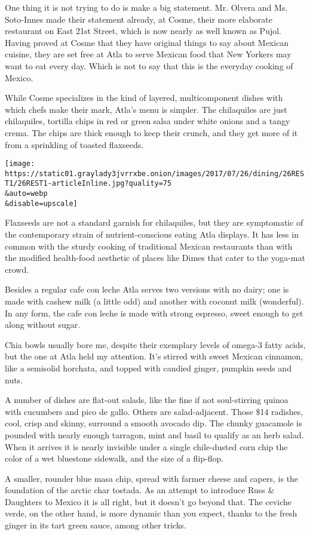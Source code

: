 One thing it is not trying to do is make a big statement. Mr. Olvera and
Ms. Soto-Innes made their statement already, at Cosme, their more
elaborate restaurant on East 21st Street, which is now nearly as well
known as Pujol. Having proved at Cosme that they have original things to
say about Mexican cuisine, they are set free at Atla to serve Mexican
food that New Yorkers may want to eat every day. Which is not to say
that this is the everyday cooking of Mexico.

While Cosme specializes in the kind of layered, multicomponent dishes
with which chefs make their mark, Atla's menu is simpler. The
chilaquiles are just chilaquiles, tortilla chips in red or green salsa
under white onions and a tangy crema. The chips are thick enough to keep
their crunch, and they get more of it from a sprinkling of toasted
flaxseeds.

\texttt{[image: https://static01.graylady3jvrrxbe.onion/images/2017/07/26/dining/26REST1/26REST1-articleInline.jpg?quality=75\\\&auto=webp\\\&disable=upscale]}

Flaxseeds are not a standard garnish for chilaquiles, but they are
symptomatic of the contemporary strain of nutrient-conscious eating Atla
displays. It has less in common with the sturdy cooking of traditional
Mexican restaurants than with the modified health-food aesthetic of
places like Dimes that cater to the yoga-mat crowd.

Besides a regular cafe con leche Atla serves two versions with no dairy;
one is made with cashew milk (a little odd) and another with coconut
milk (wonderful). In any form, the cafe con leche is made with strong
espresso, sweet enough to get along without sugar.

Chia bowls usually bore me, despite their exemplary levels of omega-3
fatty acids, but the one at Atla held my attention. It's stirred with
sweet Mexican cinnamon, like a semisolid horchata, and topped with
candied ginger, pumpkin seeds and nuts.

A number of dishes are flat-out salads, like the fine if not
soul-stirring quinoa with cucumbers and pico de gallo. Others are
salad-adjacent. Those \$14 radishes, cool, crisp and skinny, surround a
smooth avocado dip. The chunky guacamole is pounded with nearly enough
tarragon, mint and basil to qualify as an herb salad. When it arrives it
is nearly invisible under a single chile-dusted corn chip the color of a
wet bluestone sidewalk, and the size of a flip-flop.

A smaller, rounder blue masa chip, spread with farmer cheese and capers,
is the foundation of the arctic char tostada. As an attempt to introduce
Russ \& Daughters to Mexico it is all right, but it doesn't go beyond
that. The ceviche verde, on the other hand, is more dynamic than you
expect, thanks to the fresh ginger in its tart green sauce, among other
tricks.

